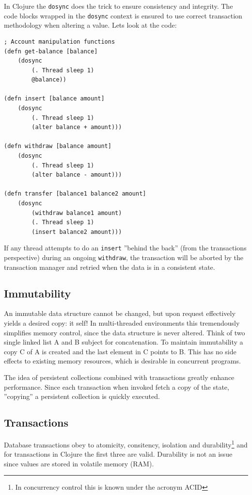\documentclass[a4paper,12pt]{kth-mag}
\begin{document}
In Clojure the \texttt{dosync} does the trick to ensure consistency and integrity. The code blocks wrapped in the \texttt{dosync} context is ensured to use correct transaction methodology when altering a value. Lets look at the code:
\begin{listing}[H]
    \begin{verbatim}
; Account manipulation functions
(defn get-balance [balance]
    (dosync
        (. Thread sleep 1)
        @balance))

(defn insert [balance amount]
    (dosync
        (. Thread sleep 1)
        (alter balance + amount)))

(defn withdraw [balance amount]
    (dosync
        (. Thread sleep 1)
        (alter balance - amount)))

(defn transfer [balance1 balance2 amount]
    (dosync
        (withdraw balance1 amount)
        (. Thread sleep 1)
        (insert balance2 amount)))
    \end{verbatim}
\end{listing}
If any thread attempts to do an \texttt{insert} ''behind the back'' (from the transactions perspective) during an ongoing \texttt{withdraw}, the transaction will be aborted by the transaction manager and retried when the data is in a consistent state. 

\subsection{Immutability} \label{sec:immutability}
An immutable data structure cannot be changed, but upon request effectively yields a desired copy: it self! In multi-threaded environments this tremendously simplifies memory control, since the data structure is never altered. Think of two single linked list A and B subject for concatenation. To maintain immutability a copy C of A is created and the last element in C points to B. This has no side effects to existing memory resources, which is desirable in concurrent programs.

The idea of persistent collections combined with transactions greatly enhance performance. Since each transaction when invoked fetch a copy of the state, ''copying'' a persistent collection is quickly executed.

\subsection{Transactions} \label{sec:transactions}
Database transactions obey to atomicity, consitency, isolation and durability\footnote{In concurrency control this is known under the acronym ACID} and for transactions in Clojure the first three are valid. Durability is not an issue since values are stored in volatile memory (RAM).
\end{document}
